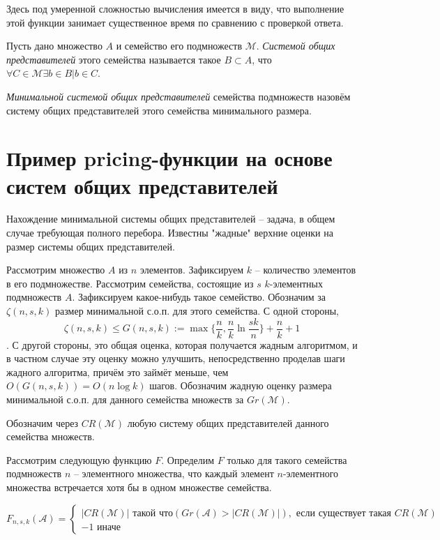 \documentclass{article}
\begin{document}
Здесь под умеренной сложностью вычисления имеется в виду, что выполнение этой функции занимает существенное время по сравнению с проверкой ответа.

Пусть дано множество $A$ и семейство его подмножеств $\mathcal{M}$. \textit{Системой общих представителей} этого семейства называется такое $B \subset A$, что $\forall C \in \mathcal{M} \exists b \in B | b \in C$. 

\textit{Минимальной системой общих представителей} семейства подмножеств назовём систему общих представителей этого семейства минимального размера.

\section{Пример pricing-функции на основе систем общих представителей}

    Нахождение минимальной системы общих представителей -- задача, в общем случае требующая полного перебора. Известны "жадные" верхние оценки на размер системы общих представителей. 

    Рассмотрим множество $A$ из $n$ элементов. Зафиксируем $k$ -- количество элементов в его подмножестве. Рассмотрим семейства, состоящие из $s$ $k$-элементных подмножеств $A$. Зафиксируем какое-нибудь такое семейство.
    Обозначим за $\zeta(n, s, k)$ размер минимальной с.о.п. для этого семейства. С одной стороны, $$\zeta(n, s, k) \leq G(n, s, k) := \max\{\frac{n}{k}, \frac{n}{k} \ln \frac{sk}{n}\} + \frac{n}{k} + 1$$. С другой стороны, это общая оценка, которая получается жадным алгоритмом, и в частном случае эту оценку можно улучшить, непосредственно проделав шаги жадного алгоритма, причём это займёт меньше, чем $O(G(n, s, k)) = O(n \log k)$ шагов. Обозначим жадную оценку размера минимальной с.о.п. для данного семейства множеств за $Gr(\mathcal{M})$.

    Обозначим через $CR(\mathcal{M})$ любую систему общих представителей данного семейства множеств.

    Рассмотрим следующую функцию $F$. Определим $F$ только для такого семейства подмножеств $n$ -- элементного множества, что каждый элемент $n$-элементного множества встречается хотя бы в одном множестве семейства.

\begin{equation*}
    F_{n,s,k}(\mathcal{A}) = 
     \begin{cases}
       |CR(\mathcal{M})| \text{ такой что} (Gr(\mathcal{A}) > |CR(\mathcal{M})|), \text{ если существует такая } CR(\mathcal{M}) \\
       -1 \text{ иначе}
    \end{cases}
\end{equation*}
    
\end{document}
